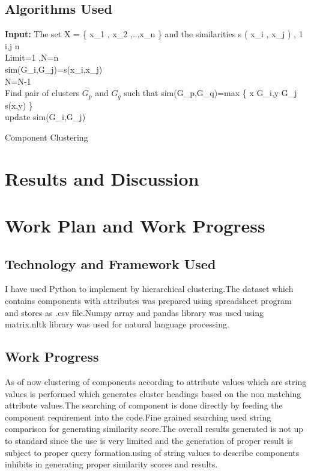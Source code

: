 \documentclass[a4paper,12pt]{article}
\begin{document}
\subsection{Algorithms Used}
\begin{algorithm}[H]
        \SetAlgoLined
        \Require \textbf{Input:} The set X = \{ x_1 , x_2 ,..,x_n \} \; and\;  the\; similarities\; s ( x_i , x_j ) , 1 \leq i,j \leq n \\
        \State Limit=1 ,N=n \\
        {
            \state sim(G_i,G_j)=s(x_i,x_j)\\
        }
        \EndFor
        {
        \State N=N-1 \\
        Find pair of clusters $G_p$ and $G_q$ such that sim(G_p,G_q)=max \{ x \epsilon G_i,y \epsilon G_j \; s(x,y) \}\\
        update sim(G_i,G_j)\\
        }
        \caption{Component Clustering}\label{algo:3}
    \end{algorithm}
\section{Results and Discussion}

\section{Work Plan and Work Progress}

\subsection{Technology and Framework Used}
I have used Python to implement by hierarchical clustering.The dataset which contains components with attributes was prepared using spreadsheet program and stores as .csv file.Numpy array and pandas library was used using matrix.nltk library was used for natural language processing.

\subsection{Work Progress}
As of now clustering of components according to attribute values which are string values is performed which generates cluster headings based on the non matching attribute values.The searching of component is done directly by feeding the component requirement into the code.Fine grained searching used string comparison for generating similarity score.The overall results generated is not up to standard since the use is very limited and the generation of proper result is subject to proper query formation.using of string values to describe components inhibits in generating proper similarity scores and results.
\end{document}
